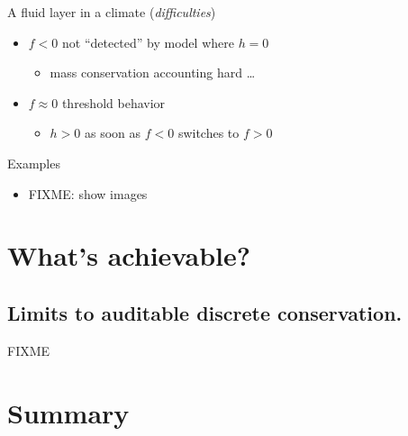 \documentclass{beamer}
\begin{document}
\begin{frame}{A fluid layer in a climate (\emph{difficulties})}

\begin{center}
\end{center}

\vspace{-9mm}
  \begin{itemize}
  \item<1-> $f<0$ not ``detected'' by model where $h=0$
     \begin{itemize}
     \item<1->[$\circ$] mass conservation accounting hard \dots
     \end{itemize}
  \item<2> $f\approx 0$ threshold behavior
     \begin{itemize}
     \item<2>[$\circ$] $h>0$ as soon as $f<0$ switches to $f>0$
     \end{itemize}
  \end{itemize}
\end{frame}


\begin{frame}{Examples}

  \begin{itemize}
  \item FIXME: show images
  \end{itemize}
\end{frame}



\section{What's achievable?}

\subsection{Limits to auditable discrete conservation.}

\begin{frame}{FIXME}
\end{frame}


\section*{Summary}
\end{document}
